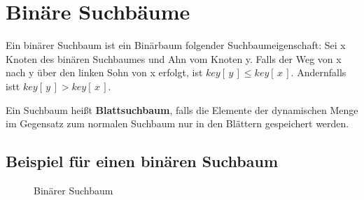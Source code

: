   \section{Binäre Suchbäume}

   \begin{definition}
    Ein binärer Suchbaum ist ein Binärbaum folgender Suchbaumeigenschaft:
    Sei x Knoten des binären Suchbaumes und Ahn vom Knoten y. Falls der Weg von x nach y über den linken Sohn von x erfolgt, ist
    $key[\,y\,]\leq key[\,x\,]$. Andernfalls istt $key[\,y\,]> key[\,x\,]$.
   \end{definition}

   \begin{definition}
   Ein Suchbaum heißt \textbf{Blattsuchbaum}, falls die Elemente der dynamischen Menge im Gegensatz zum normalen Suchbaum nur in den
   Blättern gespeichert werden.
   \end{definition}

  \subsection{Beispiel für einen binären Suchbaum}
  \begin{figure}[ht]
  \centering  
   \caption{Binärer Suchbaum}
   \label{171103a}
  \end{figure}

